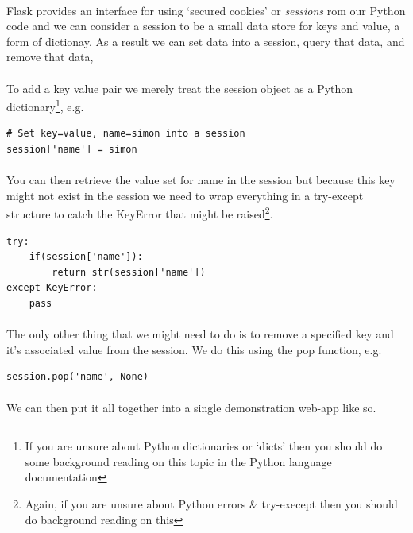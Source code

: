 \documentclass[12pt, a4paper, twoside]{book}
\begin{document}
\paragraph{} Flask provides an interface for using `secured cookies' or \emph{sessions} rom our Python code and we can consider a session to be a small data store for keys and value, a form of dictionay. As a result we can set data into a session, query that data, and remove that data, 

\paragraph{} To add a key value pair we merely treat the session object as a Python dictionary\footnote{If you are unsure about Python dictionaries or `dicts' then you should do some background reading on this topic in the Python language documentation}, e.g.
\begin{lstlisting}
# Set key=value, name=simon into a session
session['name'] = simon
\end{lstlisting}

\paragraph{} You can then retrieve the value set for name in the session but because this key might not exist in the session we need to wrap everything in a try-except structure to catch the KeyError that might be raised\footnote{Again, if you are unsure about Python errors \& try-execept then you should do background reading on this}.
\begin{lstlisting}
try:
    if(session['name']):
        return str(session['name'])
except KeyError:
    pass
\end{lstlisting}

\paragraph{} The only other thing that we might need to do is to remove a specified key and it's associated value from the session. We do this using the pop function, e.g.
\begin{lstlisting}
session.pop('name', None)
\end{lstlisting}

\paragraph{} We can then put it all together into a single demonstration web-app like so.
\end{document}
